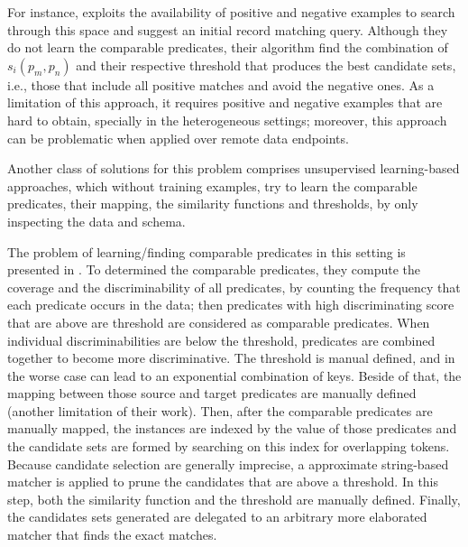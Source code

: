 For instance,\cite{DBLP:conf/vldb/ChaudhuriCGK07} exploits the availability of positive and negative examples to search through this space and suggest an initial record matching query. Although they do not learn the comparable predicates, their algorithm find the combination of $s_i(p_m,p_n)$ and their respective threshold that produces the best candidate sets, i.e., those that include all positive matches and avoid the negative ones. As a limitation of this approach,  it requires positive and negative examples that are hard to obtain, specially in the heterogeneous settings; moreover, this approach can be problematic when applied over remote data endpoints.
 
Another class of solutions for this problem comprises unsupervised learning-based approaches, which without training examples, try to learn the comparable predicates, their mapping, the similarity functions and thresholds, by only inspecting the data and schema.

The problem of learning/finding comparable predicates in this setting is presented in \cite{DBLP:conf/semweb/SongH11}. To determined the comparable predicates, they compute the coverage and the discriminability of all predicates, by counting the frequency that each predicate occurs in the data; then predicates with high discriminating score that are above are threshold are considered as comparable predicates. When individual discriminabilities are below the threshold, predicates are combined together to become more discriminative. The threshold is manual defined, and in the worse case can lead to an exponential combination of keys. Beside of that, the mapping between those source and target predicates are manually defined (another limitation of their work). Then, after the comparable predicates are manually mapped, the instances are indexed by the value of those predicates and the candidate sets are formed by searching on this index for overlapping tokens. Because candidate selection are generally imprecise, a approximate string-based matcher is applied to prune the candidates that are above a threshold. In this step, both the similarity function and the threshold are manually defined. Finally, the candidates sets generated are delegated to an arbitrary more elaborated matcher that finds the exact matches. 

